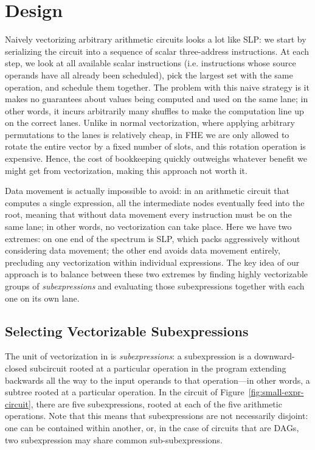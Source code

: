 \section{Design}\label{sec:design}
Naively vectorizing arbitrary arithmetic circuits looks a lot like SLP: we start by serializing the circuit into a sequence of scalar three-address instructions.
At each step, we look at all available scalar instructions (i.e. instructions whose source operands have all already been scheduled), pick the largest set with the same operation, and schedule them together.
The problem with this naive strategy is it makes no guarantees about values being computed and used on the same lane; in other words, it incurs arbitrarily many shuffles to make the computation line up on the correct lanes.
Unlike in normal vectorization, where applying arbitrary permutations to the lanes is relatively cheap, in FHE we are only allowed to rotate the entire vector by a fixed number of slots, and this rotation operation is expensive.
Hence, the cost of bookkeeping quickly outweighs whatever benefit we might get from vectorization, making this approach not worth it.

Data movement is actually impossible to avoid: in an arithmetic circuit that computes a single expression, all the intermediate nodes eventually feed into the root, meaning that without data movement every instruction must be on the same lane; in other words, no vectorization can take place.
Here we have two extremes: on one end of the spectrum is SLP, which packs aggressively without considering data movement; the other end avoids data movement entirely, precluding any vectorization within individual expressions.
The key idea of our approach is to balance between these two extremes by finding highly vectorizable groups of {\em subexpressions} and evaluating those subexpressions together with each one on its own lane.
\subsection{Selecting Vectorizable Subexpressions}\label{sec:selecting-subexpressions}

The unit of vectorization in \system is \textit{subexpressions}: a subexpression is a downward-closed subcircuit rooted at a particular operation in the program extending backwards all the way to the input operands to that operation---in other words, a subtree rooted at a particular operation. In the circuit of Figure~\ref{fig:small-expr-circuit}, there are five subexpressions, rooted at each of the five arithmetic operations. Note that this means that subexpressions are not necessarily disjoint: one can be contained within another, or, in the case of circuits that are DAGs, two subexpression may share common sub-subexpressions.

